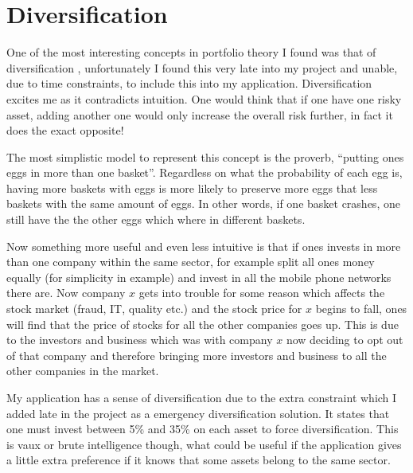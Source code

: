  \section{Diversification} %
  \label{sec:diversification}
    One of the most interesting concepts in portfolio theory I found was that of diversification \cite{diversification_2}, unfortunately I found this very late into my project and unable, due to time constraints, to include this into my application. Diversification excites me as it contradicts intuition. One would think that if one have one risky asset, adding another one would only increase the overall risk further, in fact it does the exact opposite!

    The most simplistic model to represent this concept is the proverb, ``putting ones eggs in more than one basket''. Regardless on what the probability of each egg is, having more baskets with eggs is more likely to preserve more eggs that less baskets with the same amount of eggs. In other words, if one basket crashes, one still have the the other eggs which where in different baskets. 

    Now something more useful and even less intuitive is that if ones invests in more than one company within the same sector, for example split all ones money equally (for simplicity in example) and invest in all the mobile phone networks there are. Now company $x$ gets into trouble for some reason which affects the stock market (fraud, IT, quality etc.) and the stock price for $x$ begins to fall, ones will find that the price of stocks for all the other companies goes up. This is due to the investors and business which was with company $x$ now deciding to opt out of that company and therefore bringing more investors and business to all the other companies in the market. 

    My application has a sense of diversification due to the extra constraint which I added late in the project as a emergency diversification solution. It states that one must invest between 5\% and 35\% on each asset to force diversification. This is vaux or brute intelligence though, what could be useful if the application gives a little extra preference if it knows that some assets belong to the same sector. 
